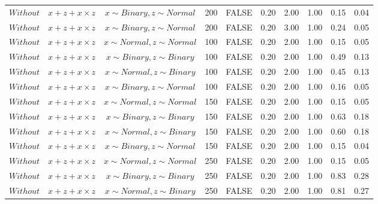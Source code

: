 \begin{longtable}{lccccccccc}
  $Without$ & $\textit{x} + \textit{z} + \textit{x} \times \textit{z}$ & $\textit{x} \sim Binary, \textit{z} \sim Normal$ & 200 & FALSE & 0.20 & 2.00 & 1.00 & 0.15 & 0.04 \\ 
  $Without$ & $\textit{x} + \textit{z} + \textit{x} \times \textit{z}$ & $\textit{x} \sim Binary, \textit{z} \sim Normal$ & 200 & FALSE & 0.20 & 3.00 & 1.00 & 0.24 & 0.05 \\ 
  $Without$ & $\textit{x} + \textit{z} + \textit{x} \times \textit{z}$ & $\textit{x} \sim Normal , \textit{z} \sim Normal$ & 100 & FALSE & 0.20 & 2.00 & 1.00 & 0.15 & 0.05 \\ 
  $Without$ & $\textit{x} + \textit{z} + \textit{x} \times \textit{z}$ & $\textit{x} \sim Binary, \textit{z} \sim Binary$ & 100 & FALSE & 0.20 & 2.00 & 1.00 & 0.49 & 0.13 \\ 
  $Without$ & $\textit{x} + \textit{z} + \textit{x} \times \textit{z}$ & $\textit{x} \sim Normal, \textit{z} \sim Binary$ & 100 & FALSE & 0.20 & 2.00 & 1.00 & 0.45 & 0.13 \\ 
  $Without$ & $\textit{x} + \textit{z} + \textit{x} \times \textit{z}$ & $\textit{x} \sim Binary, \textit{z} \sim Normal$ & 100 & FALSE & 0.20 & 2.00 & 1.00 & 0.16 & 0.05 \\ 
  $Without$ & $\textit{x} + \textit{z} + \textit{x} \times \textit{z}$ & $\textit{x} \sim Normal , \textit{z} \sim Normal$ & 150 & FALSE & 0.20 & 2.00 & 1.00 & 0.15 & 0.05 \\ 
  $Without$ & $\textit{x} + \textit{z} + \textit{x} \times \textit{z}$ & $\textit{x} \sim Binary, \textit{z} \sim Binary$ & 150 & FALSE & 0.20 & 2.00 & 1.00 & 0.63 & 0.18 \\ 
  $Without$ & $\textit{x} + \textit{z} + \textit{x} \times \textit{z}$ & $\textit{x} \sim Normal, \textit{z} \sim Binary$ & 150 & FALSE & 0.20 & 2.00 & 1.00 & 0.60 & 0.18 \\ 
  $Without$ & $\textit{x} + \textit{z} + \textit{x} \times \textit{z}$ & $\textit{x} \sim Binary, \textit{z} \sim Normal$ & 150 & FALSE & 0.20 & 2.00 & 1.00 & 0.15 & 0.04 \\ 
  $Without$ & $\textit{x} + \textit{z} + \textit{x} \times \textit{z}$ & $\textit{x} \sim Normal , \textit{z} \sim Normal$ & 250 & FALSE & 0.20 & 2.00 & 1.00 & 0.15 & 0.05 \\ 
  $Without$ & $\textit{x} + \textit{z} + \textit{x} \times \textit{z}$ & $\textit{x} \sim Binary, \textit{z} \sim Binary$ & 250 & FALSE & 0.20 & 2.00 & 1.00 & 0.83 & 0.28 \\ 
  $Without$ & $\textit{x} + \textit{z} + \textit{x} \times \textit{z}$ & $\textit{x} \sim Normal, \textit{z} \sim Binary$ & 250 & FALSE & 0.20 & 2.00 & 1.00 & 0.81 & 0.27 \\ 

\end{longtable}
